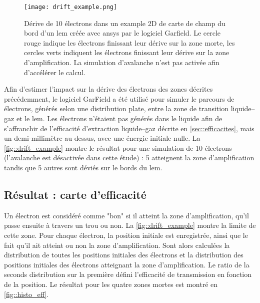                 \begin{wrapfigure}[22]{R}{0.4\textwidth}
                    \texttt{[image: drift\_example.png]}
                    \caption[Dérive de 10 électrons dans la carte de champ du bord d'un \gls{lem} avec Garfield.]{Dérive de 10 électrons dans un example 2D de carte de champ du bord d'un \gls{lem} créée avec \gls{ansys} par le logiciel Garfield. Le cercle rouge indique les électrons finissant leur dérive sur la zone morte, les cercles verts indiquent les électrons finissant leur dérive sur la zone d'amplification. La simulation d'avalanche n'est pas activée afin d'accélérer le calcul.}
                    \label{fig::drift_example}
                \end{wrapfigure}
                
                Afin d'estimer l'impact sur la dérive des électrons des zones décrites précédemment, le logiciel GarField \cite{garfield} a été utilisé pour simuler le parcours de  électrons, générés selon une distribution plate, entre la zone de transition liquide--gaz et le \gls{lem}. Les électrons n'étaient pas générés dans le liquide afin de s'affranchir de l'efficacité d'extraction liquide--gaz décrite en \autoref{sec::efficacites}, mais un demi-millimètre au dessus, avec une énergie initiale nulle. La \autoref{fig::drift_example} %
                montre le résultat pour une simulation de 10 électrons (l'avalanche est désactivée dans cette étude) : 5  atteignent la zone d'amplification tandis que 5 autres sont déviés sur le bords du \gls{lem}.
                
        \subsection{Résultat : carte d'efficacité}
        
            Un électron est considéré comme "bon" si il atteint la zone d'amplification, qu'il passe ensuite à travers un trou ou non. La \autoref{fig::drift_example} montre la limite de cette zone. Pour chaque électron, la position initiale est enregistrée, ainsi que le fait qu'il ait atteint ou non la zone d'amplification. Sont alors calculées la distribution de toutes les positions initiales des électrons et la distribution des positions initiales des électrons atteignant la zone d'amplification. Le ratio de la seconds distribution sur la première défini l'efficacité de transmission en fonction de la position. Le résultat pour les quatre zones mortes est montré en \autoref{fig::histo_eff}.
            
